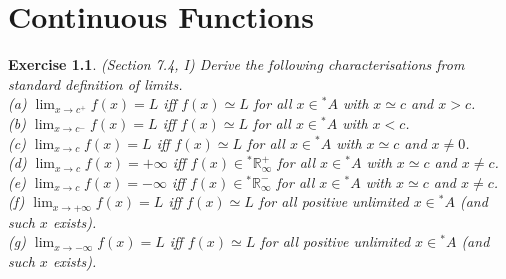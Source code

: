 \documentclass[a4paper, 11pt, openany]{book}
\theoremstyle{plain}
\newtheorem{exercise}{Exercise}[chapter]
\theoremstyle{plain}
\newcommand{\arr}{\rightarrow}
\newcommand{\R}{\mathbb{R}}
\newcommand{\hyp}{{}^*}
\begin{document}
\chapter{Continuous Functions} 

  \begin{exercise}
    (Section 7.4, I)
      Derive the following characterisations from standard definition of limits. \\
      (a) $\lim_{x \arr c^+} f(x)=L$ iff $f(x) \simeq L$ for all $x \in \hyp A$ with $x \simeq c$ and $x>c$. \\
      (b) $\lim_{x \arr c^-} f(x)=L$ iff $f(x) \simeq L$ for all $x \in \hyp A$ with $x<c$. \\
      (c) $\lim_{x \arr c} f(x)=L$ iff $f(x) \simeq L$ for all $x \in \hyp A$ with $x \simeq c$ and $x \not =0$. \\
      (d) $\lim_{x \arr c} f(x)=+ \infty$ iff $f(x) \in \hyp \R_\infty^+$ for all $x \in \hyp A$ with $x \simeq c$ and $x \not = c$. \\
      (e) $\lim_{x \arr c} f(x) = -\infty$ iff $f(x) \in \hyp \R_\infty^-$ for all $x \in \hyp A$ with $x \simeq c$ and $x \not =c$. \\
      (f) $\lim_{x \arr + \infty} f(x)=L$ iff $f(x) \simeq L$ for all positive unlimited $x \in \hyp A$ (and such $x$ exists). \\
      (g) $\lim_{x \arr - \infty} f(x)=L$ iff $f(x) \simeq L$ for all positive unlimited $x \in \hyp A$ (and such $x$ exists).
  \end{exercise}
\end{document}
